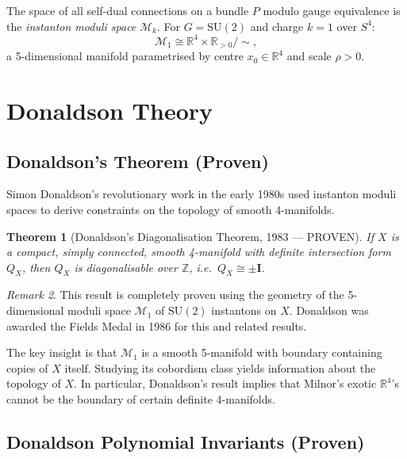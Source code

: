 \documentclass[12pt,a4paper]{amsart}
\newtheorem{theorem}{Theorem}[section]
\theoremstyle{definition}
\theoremstyle{remark}
\newtheorem{remark}[theorem]{Remark}
\begin{document}
The space of all self-dual connections on a bundle $P$ modulo gauge equivalence is the
\emph{instanton moduli space} $\mathcal{M}_k$. For $G = \mathrm{SU}(2)$ and charge $k=1$
over $S^4$:
\[
  \mathcal{M}_1 \cong \mathbb{R}^4 \times \mathbb{R}_{>0} / \sim,
\]
a 5-dimensional manifold parametrised by centre $x_0 \in \mathbb{R}^4$ and scale $\rho > 0$.

\section{Donaldson Theory}
\label{sec:donaldson}

\subsection{Donaldson's Theorem (Proven)}

Simon Donaldson's revolutionary work in the early 1980s used instanton moduli spaces
to derive constraints on the topology of smooth 4-manifolds.

\begin{theorem}[Donaldson's Diagonalisation Theorem, 1983 — PROVEN]
\label{thm:donaldson}
If $X$ is a compact, simply connected, smooth 4-manifold with definite intersection
form $Q_X$, then $Q_X$ is diagonalisable over $\mathbb{Z}$, i.e.\ $Q_X \cong \pm \mathbf{I}$.
\end{theorem}

\begin{remark}
This result is completely proven using the geometry of the 5-dimensional moduli space
$\mathcal{M}_1$ of $\mathrm{SU}(2)$ instantons on $X$. Donaldson was awarded the
Fields Medal in 1986 for this and related results.
\end{remark}

The key insight is that $\mathcal{M}_1$ is a smooth 5-manifold with boundary containing
copies of $X$ itself. Studying its cobordism class yields information about the topology
of $X$. In particular, Donaldson's result implies that Milnor's exotic $\mathbb{R}^4$'s
cannot be the boundary of certain definite 4-manifolds.

\subsection{Donaldson Polynomial Invariants (Proven)}
\end{document}
